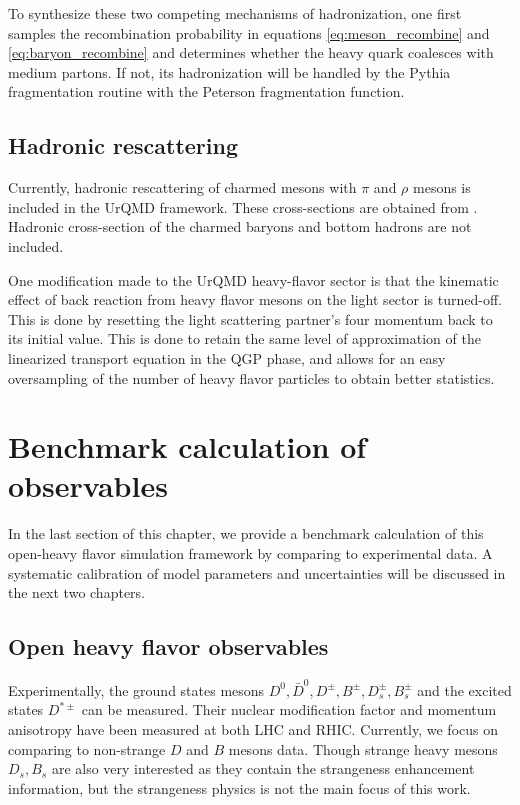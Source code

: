 To synthesize these two competing mechanisms of hadronization, one first samples the recombination probability in equations \ref{eq:meson_recombine} and \ref{eq:baryon_recombine} and determines whether the heavy quark coalesces with medium partons. 
If not, its hadronization will be handled by the Pythia fragmentation routine with the Peterson fragmentation function.

\subsection{Hadronic rescattering}
Currently, hadronic rescattering of charmed mesons with $\pi$ and $\rho$ mesons is included in the UrQMD framework. 
These cross-sections are obtained from \cite{Lin:2000jp}.
Hadronic cross-section of the charmed baryons and bottom hadrons are not included.

One modification made to the UrQMD heavy-flavor sector is that the kinematic effect of back reaction from heavy flavor mesons on the light sector is turned-off. 
This is done by resetting the light scattering partner's four momentum back to its initial value.
This is done to retain the same level of approximation of the linearized transport equation in the QGP phase, and allows for an easy oversampling of the number of heavy flavor particles to obtain better statistics.

\section{Benchmark calculation of observables}
\label{section:benchmark}
In the last section of this chapter, we provide a benchmark calculation of this open-heavy flavor simulation framework by comparing to experimental data. 
A systematic calibration of model parameters and uncertainties will be discussed in the next two chapters.

\subsection{Open heavy flavor observables}
Experimentally, the ground states mesons $D^0, \bar{D}^0, D^{\pm}, B^{\pm}, D_s^{\pm}, B_s^{\pm}$ and the excited states $D^{*\pm}$ can be measured. 
Their nuclear modification factor and momentum anisotropy have been measured at both LHC and RHIC.
Currently, we focus on comparing to non-strange $D$ and $B$ mesons data.
Though strange heavy mesons $D_s, B_s$ are also very interested as they contain the strangeness enhancement information, but the strangeness physics is not the main focus of this work.

